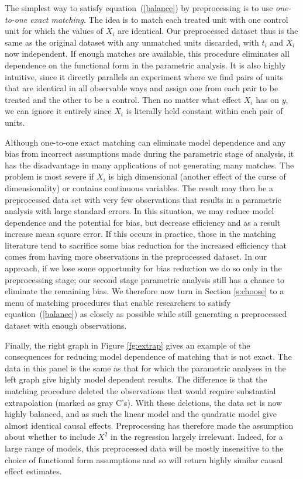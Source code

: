 \documentclass[11pt,titlepage]{article}
\begin{document}
The simplest way to satisfy equation~(\ref{balance}) by preprocessing
is to use \emph{one-to-one exact matching}.  The idea is to match each
treated unit with one control unit for which the values of $X_i$ are
identical.  Our preprocessed dataset thus is the same as the original
dataset with any unmatched units discarded, with $t_i$ and $X_i$ now
independent.  If enough matches are available, this procedure
eliminates all dependence on the functional form in the parametric
analysis.  It is also highly intuitive, since it directly parallels an
experiment where we find pairs of units that are identical in all
observable ways and assign one from each pair to be treated and the
other to be a control.  Then no matter what effect $X_i$ has on $y$,
we can ignore it entirely since $X_i$ is literally held constant
within each pair of units.

Although one-to-one exact matching can eliminate model dependence and
any bias from incorrect assumptions made during the parametric stage
of analysis, it has the disadvantage in many applications of not
generating many matches.  The problem is most severe if $X_i$ is high
dimensional (another effect of the curse of dimensionality) or
contains continuous variables.  The result may then be a preprocessed
data set with very few observations that results in a parametric
analysis with large standard errors.  In this situation, we may reduce
model dependence and the potential for bias, but decrease efficiency
and as a result increase mean square error.  If this occurs in
practice, those in the matching literature tend to sacrifice some bias
reduction for the increased efficiency that comes from having more
observations in the preprocessed dataset.  In our approach, if we lose
some opportunity for bias reduction we do so only in the preprocessing
stage; our second stage parametric analysis still has a chance to
eliminate the remaining bias.  We therefore now turn in Section
\ref{s:choose} to a menu of matching procedures that enable
researchers to satisfy equation~(\ref{balance}) as closely as possible
while still generating a preprocessed dataset with enough
observations.

Finally, the right graph in Figure \ref{fg:extrap} gives an example of
the consequences for reducing model dependence of matching that is not
exact.  The data in this panel is the same as that for which the
parametric analyses in the left graph give highly model dependent
results.  The difference is that the matching procedure deleted the
observations that would require substantial extrapolation (marked as
gray C's).  With these deletions, the data set is now highly balanced,
and as such the linear model and the quadratic model give almost
identical causal effects.  Preprocessing has therefore made the
assumption about whether to include $X^2$ in the regression largely
irrelevant.  Indeed, for a large range of models, this preprocessed
data will be mostly insensitive to the choice of functional form
assumptions and so will return highly similar causal effect estimates.
\end{document}
